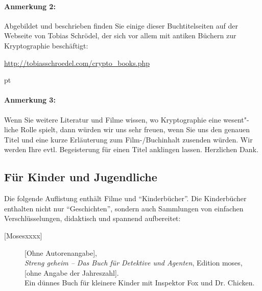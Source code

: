 \begin{refsegment}
\paragraph*{Anmerkung 2:}
Abgebildet und beschrieben finden Sie einige dieser Buchtitelseiten
auf der Webseite von Tobias Schrödel, der sich vor allem mit
antiken Büchern zur Kryptographie beschäftigt:
\parskip -4pt  %
\begin{center}
   \url{http://tobiasschroedel.com/crypto_books.php}
\end{center}  %
\parskip \value{mycounterDefaultParskip} pt  %
\vspace{2em}


\paragraph*{Anmerkung 3:}
Wenn Sie weitere Literatur und Filme wissen, wo Kryptographie eine
wesent"-liche Rolle spielt, dann würden wir uns sehr freuen, wenn Sie
uns den genauen Titel und eine kurze Erläuterung zum Film-/Buchinhalt
zusenden würden. Wir werden Ihre evtl. Begeisterung für einen Titel
anklingen lassen. Herzlichen Dank.\\





\newpage
\subsection{Für Kinder und Jugendliche}

Die folgende Auflistung enthält Filme und "`Kinderbücher"'.
Die Kinderbücher enthalten nicht nur "`Geschichten"', sondern auch Sammlungen von
einfachen Verschlüsselungen, didaktisch und spannend aufbereitet:

\begin{description}

\item[\textrm{[Mosesxxxx]}] 
    [Ohne Autorenangabe], \\
    {\em Streng geheim -- Das Buch für Detektive und Agenten},
    Edition moses, [ohne Angabe der Jahreszahl]. \\
    Ein dünnes Buch für kleinere Kinder mit Inspektor Fox und Dr. Chicken.\\



\end{description}
\end{refsegment}
